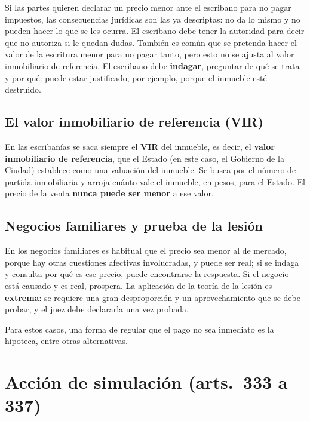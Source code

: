 \documentclass[12pt,oneside]{book}
\begin{document}
Si las partes quieren declarar un precio menor ante el escribano para no pagar impuestos, las consecuencias jur\'idicas son las ya descriptas: no da lo mismo y no pueden hacer lo que se les ocurra. El escribano debe tener la autoridad para decir que no autoriza si le quedan dudas. Tambi\'en es com\'un que se pretenda hacer el valor de la escritura menor para no pagar tanto, pero esto no se ajusta al valor inmobiliario de referencia. El escribano debe \textbf{indagar}, preguntar de qu\'e se trata y por qu\'e: puede estar justificado, por ejemplo, porque el inmueble est\'e destruido.


\subsection{El valor inmobiliario de referencia (VIR)}

En las escriban\'ias se saca siempre el \textbf{VIR} del inmueble, es decir, el \textbf{valor inmobiliario de referencia}, que el Estado (en este caso, el Gobierno de la Ciudad) establece como una valuaci\'on del inmueble. Se busca por el n\'umero de partida inmobiliaria y arroja cu\'anto vale el inmueble, en pesos, para el Estado. El precio de la venta \textbf{nunca puede ser menor} a ese valor.

\subsection{Negocios familiares y prueba de la lesi\'on}

En los negocios familiares es habitual que el precio sea menor al de mercado, porque hay otras cuestiones afectivas involucradas, y puede ser real; si se indaga y consulta por qu\'e es ese precio, puede encontrarse la respuesta. Si el negocio est\'a causado y es real, prospera. La aplicaci\'on de la teor\'ia de la lesi\'on es \textbf{extrema}: se requiere una gran desproporci\'on y un aprovechamiento que se debe probar, y el juez debe declararla una vez probada.

Para estos casos, una forma de regular que el pago no sea inmediato es la hipoteca, entre otras alternativas.

\section{Acci\'on de simulaci\'on (arts.~333 a 337)}
\end{document}
